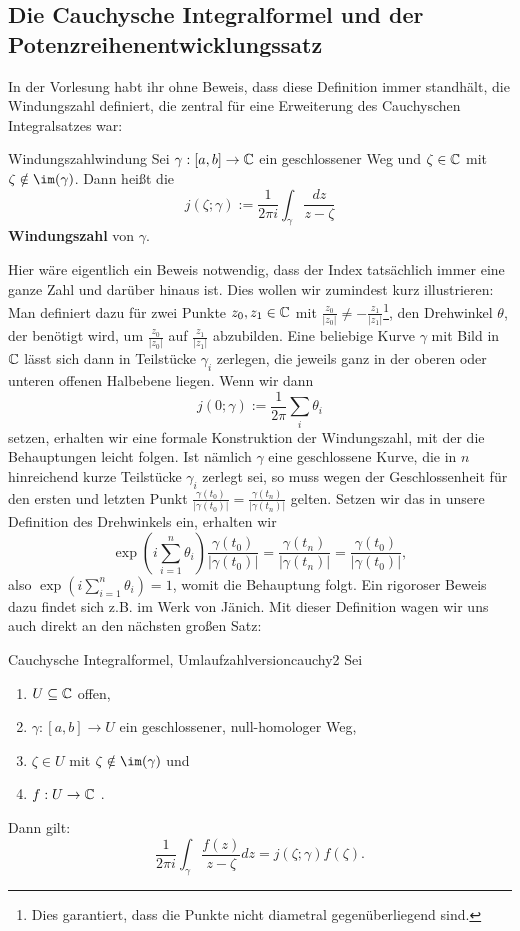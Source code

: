 \subsection{Die Cauchysche Integralformel und der Potenzreihenentwicklungssatz}
In der Vorlesung habt ihr ohne Beweis, dass diese Definition immer standhält, die Windungszahl definiert, die zentral für eine Erweiterung des Cauchyschen Integralsatzes war:
\begin{definition}{Windungszahl}{windung}
Sei $\gamma: [a,b] \to \mathbb{C}$ ein geschlossener Weg und $\zeta \in \mathbb{C}$ mit $\zeta \notin \im(\gamma)$. Dann heißt die 
\begin{equation}
j(\zeta; \gamma):= \frac{1}{2\pi i} \int_\gamma \frac{dz}{z-\zeta}
\end{equation}
\textbf{Windungszahl} von $\gamma$.
\end{definition}
Hier wäre eigentlich ein Beweis notwendig, dass der Index tatsächlich immer eine ganze Zahl und darüber hinaus  ist. Dies wollen wir zumindest kurz illustrieren: Man definiert dazu für zwei Punkte $z_0,z_1 \in \mathbb{C}$ mit $\frac{z_0}{|z_0|}\neq - \frac{z_1}{|z_1|}$\footnote{Dies garantiert, dass die Punkte nicht diametral gegenüberliegend sind.}, den Drehwinkel $\theta$, der benötigt wird, um $\frac{z_0}{|z_0|}$ auf $\frac{z_1}{|z_1|}$ abzubilden. Eine beliebige Kurve $\gamma$ mit Bild in $\mathbb{C}$ lässt sich dann in Teilstücke $\gamma_i$ zerlegen, die jeweils ganz in der oberen oder unteren offenen Halbebene liegen. Wenn wir dann $$j(0; \gamma):=\frac{1}{2\pi} \sum_i \theta_i$$ setzen, erhalten wir eine formale Konstruktion der Windungszahl, mit der die Behauptungen leicht folgen. Ist nämlich $\gamma$ eine geschlossene Kurve, die in $n$ hinreichend kurze Teilstücke $\gamma_i$ zerlegt sei, so muss wegen der Geschlossenheit für den ersten und letzten Punkt $\frac{\gamma(t_0)}{|\gamma(t_0)|} = \frac{\gamma(t_n)}{|\gamma(t_n)|}$ gelten. Setzen wir das in unsere Definition des Drehwinkels ein, erhalten wir
\begin{equation}
\exp(i \sum_{i=1}^n \theta_i) \frac{\gamma(t_0)}{|\gamma(t_0)|} = \frac{\gamma(t_n)}{|\gamma(t_n)|} = \frac{\gamma(t_0)}{|\gamma(t_0)|},
\end{equation}
also $\exp(i\sum_{i=1}^n \theta_i) = 1$, womit die Behauptung folgt. Ein rigoroser Beweis dazu findet sich z.B. im Werk von Jänich. Mit dieser Definition wagen wir uns auch direkt an den nächsten großen Satz:
\begin{theorem}{Cauchysche Integralformel, Umlaufzahlversion}{cauchy2}
Sei
\begin{enumerate}
\item $U \subseteq \mathbb{C}$ offen,
\item $\gamma: [a,b] \to U$ ein geschlossener, null-homologer Weg,
\item $\zeta \in U$ mit $\zeta \notin \im(\gamma)$ und
\item $f: U \to \mathbb{C}$ .
\end{enumerate}
Dann gilt:
\begin{equation}
\frac{1}{2\pi i}\int_\gamma \frac{f(z)}{z-\zeta} dz = j(\zeta; \gamma) f(\zeta).
\end{equation}
\end{theorem}
